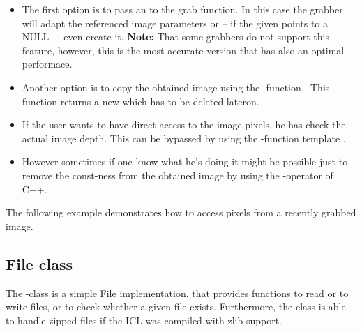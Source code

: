 \begin{itemize}
\item The first option is to pass an  to the grab function. In this case the grabber will adapt the referenced image parameters or -- if the given  points to a NULL- -- even create it. \textbf{Note:} That some grabbers do not support this feature, however, this is the most accurate version that has also an optimal performace.
\item Another option is to copy the obtained image using the -function . This function returns a new  which has to be deleted lateron.
\item If the user wants to have direct access to the image pixels, he has check the actual image depth. This can be bypassed by using the -function template .
\item However sometimes if one know what he's doing it might be possible just to remove the const-ness from the obtained image by using the -operator of C++.
\end{itemize} 

The following example demonstrates how to access pixels from a recently grabbed image.


\subsection{File class}
The -class  is a simple File implementation, that provides functions to read or to write files, or to check whether a given file exists. Furthermore, the  class is able to handle zipped files if the ICL was compiled with zlib support.

